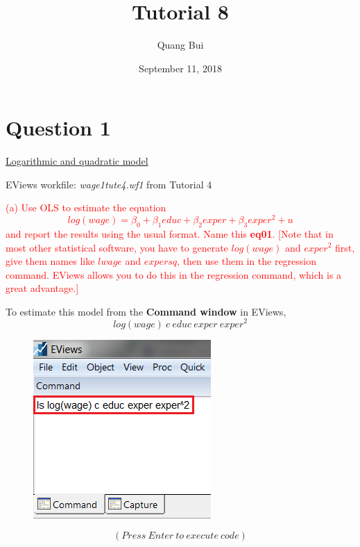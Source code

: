 \documentclass[12pt]{report}
\title{Tutorial 8}
\subtitle
{
	\textbf{keywords}: binary variables, dummy variables, intercept, slope, conditional expectation, regression line, F-test, prediction intervals, prediction uncertainty, estimation uncertainty, variation in error, sum of squared residuals, Chow test, confidence intervals, standard errors
	
	\textbf{estimated reading time}: 36 minutes
}
\author{Quang Bui}
\date{September 11, 2018}
\begin{document}
	
\maketitle

\newpage
\section*{Question 1}
\noindent \uline{Logarithmic and quadratic model}

\noindent EViews workfile: \textit{wage1tute4.wf1} from Tutorial 4

\noindent \textcolor{red}
{
	(a) Use OLS to estimate the equation
	$$log(wage) = \beta_0 + \beta_1educ + \beta_2exper + \beta_3exper^2 + u$$
	and report the results using the usual format. Name this \textbf{eq01}. [Note that in most other statistical software, you have to generate $log(wage)$ and $exper^2$ first, give them names like $lwage$ and $expersq$, then use them in the regression command. EViews allows you to do this in the regression command, which is a great advantage.]
}

\noindent To estimate this model from the \textbf{Command window} in EViews,
$$log(wage)\ c\ educ\ exper\ exper^2$$
\begin{figure}[H]
	\centering
	\includegraphics{tute8_q1_1}
\end{figure}
\vspace{-\baselineskip}
\noindent $$(Press\ Enter\ to\ execute\ code)$$
\end{document}
